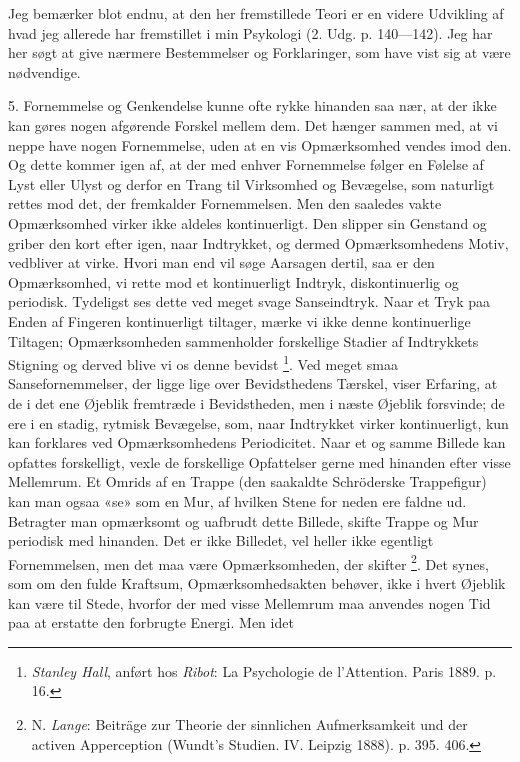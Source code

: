 \documentclass[12pt,a4paper,openany]{book}
\newcommand{\opage}[1]{\marginnote{\footnotesize\textit{[#1]}}}
\begin{document}
Jeg bemærker blot endnu, at den her fremstillede Teori er en videre Udvikling
af hvad jeg allerede har fremstillet i min Psykologi (2. Udg. p. 140---142).
Jeg har her søgt at give nærmere Bestemmelser og Forklaringer, som have vist
sig at være nødvendige.

5. Fornemmelse og Genkendelse kunne ofte rykke hinanden saa nær, at der ikke
kan gøres nogen afgørende Forskel mellem dem. Det hænger sammen med, at vi
neppe have nogen Fornemmelse, uden at en vis Opmærksomhed vendes imod den. Og
dette kommer igen af, at der med enhver Fornemmelse følger en Følelse af Lyst
eller Ulyst og derfor en Trang til Virksomhed og Bevægelse, som naturligt
rettes mod det, der fremkalder Fornemmelsen. Men den saaledes vakte
Opmærksomhed virker ikke aldeles kontinuerligt. Den slipper sin Genstand og
griber den kort efter igen, naar Indtrykket, og dermed Opmærksomhedens Motiv,
vedbliver at virke. Hvori man end vil søge Aarsagen dertil, saa er den
Opmærksomhed, vi rette mod et kontinuerligt Indtryk, diskontinuerlig og
periodisk. Tydeligst ses dette ved meget svage Sanseindtryk. Naar et Tryk paa
Enden af Fingeren kontinuerligt tiltager, mærke vi ikke denne kontinuerlige
Tiltagen; Opmærksomheden sammenholder forskellige Stadier af Indtrykkets
Stigning og derved blive vi os denne bevidst%
\footnote[2]{\emph{Stanley Hall}, anført hos \emph{Ribot}: La Psychologie de
l'Attention. Paris 1889. p. 16.}. Ved meget smaa Sansefornemmelser, der ligge
lige over Bevidsthedens
\setcounter{footnote}{0}%
\opage{14}Tærskel, viser Erfaring, at de i det ene Øjeblik fremtræde i
Bevidstheden, men i næste Øjeblik forsvinde; de ere i en stadig, rytmisk
Bevægelse, som, naar Indtrykket virker kontinuerligt, kun kan forklares ved
Opmærksomhedens Periodicitet. Naar et og samme Billede kan opfattes
forskelligt, vexle de forskellige Opfattelser gerne med hinanden efter visse
Mellemrum. Et Omrids af en Trappe (den saakaldte Schröderske Trappefigur) kan
man ogsaa «se» som en Mur, af hvilken Stene for neden ere faldne ud. Betragter
man opmærksomt og uafbrudt dette Billede, skifte Trappe og Mur periodisk med
hinanden. Det er ikke Billedet, vel heller ikke egentligt Fornemmelsen, men det
maa være Opmærksomheden, der skifter%
\footnote[1]{N. \emph{Lange}: Beiträge zur Theorie der sinnlichen
Aufmerksamkeit und der activen Apperception (Wundt's Studien. IV. Leipzig
1888). p. 395. 406.}. Det synes, som om den fulde Kraftsum, Opmærksomhedsakten
behøver, ikke i hvert Øjeblik kan være til Stede, hvorfor der med visse
Mellemrum maa anvendes nogen Tid paa at erstatte den forbrugte Energi. Men idet
\end{document}
